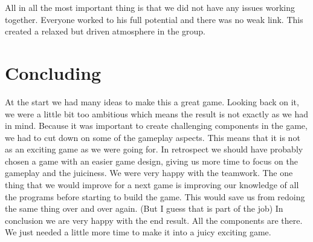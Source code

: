 \documentclass{article}
\begin{document}
All in all the most important thing is that we did not have any issues working together. Everyone worked to his full potential and there was no weak link. This created a relaxed but driven atmosphere in the group.



\section{Concluding}
At the start we had many ideas to make this a great game. Looking back on it, we were a little bit too ambitious which means the result is not exactly as we had in mind. Because it was important to create challenging components in the game, we had to cut down on some of the gameplay aspects. This means that it is not as an exciting game as we were going for. In retrospect we should have probably chosen a game with an easier game design, giving us more time to focus on the gameplay and the juiciness. We were very happy with the teamwork. The one thing that we would improve for a next game is improving our knowledge of all the programs before starting to build the game. This would save us from redoing the same thing over and over again. (But I guess that is part of the job)
In conclusion we are very happy with the end result. All the components are there. We just needed a little more time to make it into a juicy exciting game.
\end{document}
